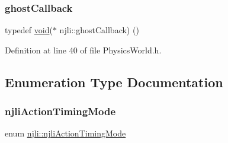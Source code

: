 \subsubsection{\texorpdfstring{ghost\+Callback}{ghostCallback}}
{\footnotesize\ttfamily typedef \mbox{\hyperlink{_thread_8h_af1e856da2e658414cb2456cb6f7ebc66}{void}}($\ast$ njli\+::ghost\+Callback) ()}



Definition at line 40 of file Physics\+World.\+h.



\subsection{Enumeration Type Documentation}
\mbox{\label{namespacenjli_affc383078a5935be1509062828a1824b}} 
\subsubsection{\texorpdfstring{njli\+Action\+Timing\+Mode}{njliActionTimingMode}}
{\footnotesize\ttfamily enum \mbox{\hyperlink{namespacenjli_affc383078a5935be1509062828a1824b}{njli\+::njli\+Action\+Timing\+Mode}}}

